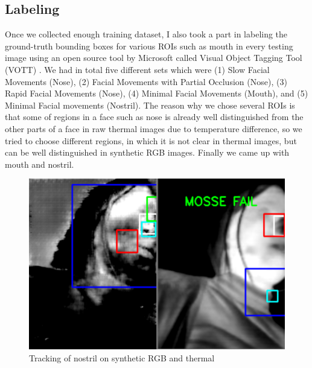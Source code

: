 \documentclass[conference]{IEEEtran}
\begin{document}
\subsection{Labeling}
Once we collected enough training dataset, I also took a part in labeling the ground-truth bounding boxes for various ROIs such as mouth in every testing image using an open source tool by Microsoft called Visual Object Tagging Tool (VOTT) \cite{b17}. We had in total five different sets which were (1) Slow Facial Movements (Nose), (2) Facial Movements with Partial Occlusion (Nose), (3) Rapid Facial Movements (Nose), (4) Minimal Facial Movements (Mouth), and (5) Minimal Facial movements (Nostril). The reason why we chose several ROIs is that some of regions in a face such as nose is already well distinguished from the other parts of a face in raw thermal images due to temperature difference, so we tried to choose different regions, in which it is not clear in thermal images, but can be well distinguished in synthetic RGB images. Finally we came up with mouth and nostril.

\begin{figure}[htbp]
\centerline{\includegraphics[scale = 0.25]{nostril.png}}
\caption{Tracking of nostril on synthetic RGB and thermal\cite{b20}}
\label{fig}
\end{figure}
\end{document}
